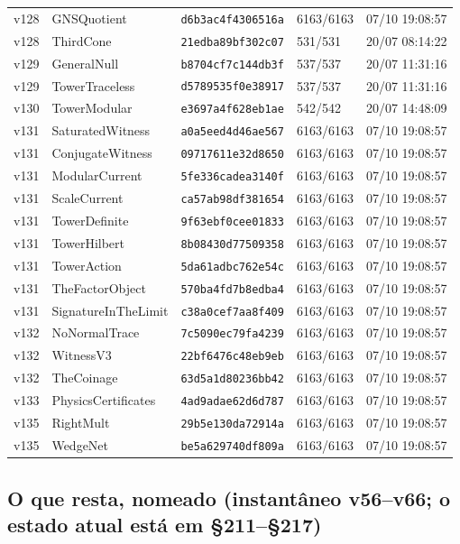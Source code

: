\documentclass[11pt]{article}
\theoremstyle{definition}\newtheorem{deriv}{Derivação}
\begin{document}
{\begin{longtable}{@{}lllll@{}}
v128 & GNSQuotient & \texttt{d6b3ac4f4306516a} & 6163/6163 & 07/10 19:08:57 \\
v128 & ThirdCone & \texttt{21edba89bf302c07} & 531/531 & 20/07 08:14:22 \\
v129 & GeneralNull & \texttt{b8704cf7c144db3f} & 537/537 & 20/07 11:31:16 \\
v129 & TowerTraceless & \texttt{d5789535f0e38917} & 537/537 & 20/07 11:31:16 \\
v130 & TowerModular & \texttt{e3697a4f628eb1ae} & 542/542 & 20/07 14:48:09 \\
v131 & SaturatedWitness & \texttt{a0a5eed4d46ae567} & 6163/6163 & 07/10 19:08:57 \\
v131 & ConjugateWitness & \texttt{09717611e32d8650} & 6163/6163 & 07/10 19:08:57 \\
v131 & ModularCurrent & \texttt{5fe336cadea3140f} & 6163/6163 & 07/10 19:08:57 \\
v131 & ScaleCurrent & \texttt{ca57ab98df381654} & 6163/6163 & 07/10 19:08:57 \\
v131 & TowerDefinite & \texttt{9f63ebf0cee01833} & 6163/6163 & 07/10 19:08:57 \\
v131 & TowerHilbert & \texttt{8b08430d77509358} & 6163/6163 & 07/10 19:08:57 \\
v131 & TowerAction & \texttt{5da61adbc762e54c} & 6163/6163 & 07/10 19:08:57 \\
v131 & TheFactorObject & \texttt{570ba4fd7b8edba4} & 6163/6163 & 07/10 19:08:57 \\
v131 & SignatureInTheLimit & \texttt{c38a0cef7aa8f409} & 6163/6163 & 07/10 19:08:57 \\
v132 & NoNormalTrace & \texttt{7c5090ec79fa4239} & 6163/6163 & 07/10 19:08:57 \\
v132 & WitnessV3 & \texttt{22bf6476c48eb9eb} & 6163/6163 & 07/10 19:08:57 \\
v132 & TheCoinage & \texttt{63d5a1d80236bb42} & 6163/6163 & 07/10 19:08:57 \\
v133 & PhysicsCertificates & \texttt{4ad9adae62d6d787} & 6163/6163 & 07/10 19:08:57 \\
v135 & RightMult & \texttt{29b5e130da72914a} & 6163/6163 & 07/10 19:08:57 \\
v135 & WedgeNet & \texttt{be5a629740df809a} & 6163/6163 & 07/10 19:08:57 \\
\bottomrule\end{longtable}}

\subsection*{O que resta, nomeado (instantâneo v56--v66; o estado atual está em \S211--\S217)}
\end{document}

